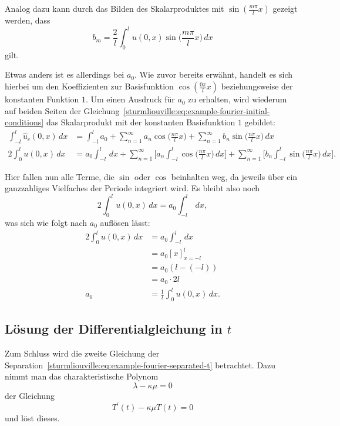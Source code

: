 Analog dazu kann durch das Bilden des Skalarproduktes mit 
$ \sin(\frac{m \pi}{l}x) $ gezeigt werden, dass
\[
    b_m
    =
    \frac{2}{l} \int_{0}^{l}u(0, x)\sin\biggl(\frac{m \pi}{l}x\biggr)\,dx
\]
gilt.

Etwas anders ist es allerdings bei $a_0$.
Wie zuvor bereits erwähnt, handelt es sich hierbei um den Koeffizienten
zur Basisfunktion $\cos(\frac{0 \pi}{l}x)$ beziehungsweise der
konstanten Funktion $1$.
Um einen Ausdruck für $a_0$ zu erhalten, wird wiederum auf beiden Seiten
der Gleichung~\eqref{sturmliouville:eq:example-fourier-initial-conditions} das
Skalarprodukt mit der konstanten Basisfunktion $1$ gebildet:
\[
\begin{aligned}
    \int_{-l}^{l}\hat{u}_c(0, x)\,dx
    &=
    \int_{-l}^{l} a_0
    +
    \sum_{n = 1}^{\infty} a_n\cos\biggl(\frac{n\pi}{l}x\biggr)
    +
    \sum_{n = 1}^{\infty} b_n\sin\biggl(\frac{n\pi}{l}x\biggr)\,dx
    \\
    2\int_{0}^{l}u(0, x)\,dx
    &=
    a_0 \int_{-l}^{l}\,dx
    +
    \sum_{n = 1}^{\infty}\biggl[a_n\int_{-l}^{l}\cos\biggl(\frac{n\pi}{l}x\biggr)
        \,dx\biggr] +
    \sum_{n = 1}^{\infty}\biggl[b_n\int_{-l}^{l}\sin\biggl(\frac{n\pi}{l}x\biggr)
        \,dx\biggr].
\end{aligned}
\]

Hier fallen nun alle Terme, die $\sin$ oder $\cos$ beinhalten weg, da jeweils
über ein ganzzahliges Vielfaches der Periode integriert wird.
Es bleibt also noch
\[
    2\int_{0}^{l}u(0, x)\,dx
    =
    a_0 \int_{-l}^{l}\,dx,
\]
was sich wie folgt nach $a_0$ auflösen lässt:
\[
\begin{aligned}
    2\int_{0}^{l}u(0, x)\,dx
    &=
    a_0 \int_{-l}^{l}\,dx
    \\
    &=
    a_0 [x]_{x=-l}^{l}
    \\
    &=
    a_0(l - (-l))
    \\
    &=
    a_0 \cdot 2l
    \\
    a_0
    &=
    \frac{1}{l} \int_{0}^{l}u(0, x)\,dx.
\end{aligned}
\]

%
%

\subsection{Lösung der Differentialgleichung in \texorpdfstring{$t$}{t}}
Zum Schluss wird die zweite Gleichung der 
Separation~\eqref{sturmliouville:eq:example-fourier-separated-t} betrachtet.
Dazu nimmt man das charakteristische Polynom
\[
    \lambda - \kappa \mu
    =
    0
\]
der Gleichung
\[
    T^{\prime}(t) - \kappa \mu T(t)
    =
    0
\]
und löst dieses.

